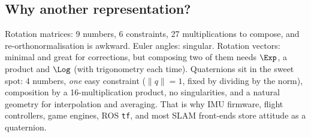 \subsection{Why another representation?}\label{sec:rot:another-representation}
Rotation matrices: 9 numbers, 6 constraints, 27 multiplications to compose, and re-orthonormalisation is awkward. Euler angles: singular. Rotation vectors: minimal and great for corrections, but composing two of them needs $\Exp$, a product and $\Log$ (with trigonometry each time). Quaternions sit in the sweet spot: 4 numbers, \emph{one} easy constraint ($\|q\|=1$, fixed by dividing by the norm), composition by a 16-multiplication product, no singularities, and a natural geometry for interpolation and averaging. That is why IMU firmware, flight controllers, game engines, ROS \texttt{tf}, and most SLAM front-ends store attitude as a quaternion.
